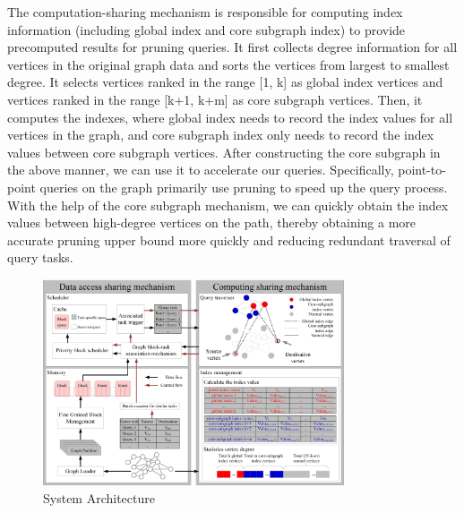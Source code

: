 \documentclass[lettersize,journal]{IEEEtran} %
\begin{document}
The computation-sharing mechanism is responsible for computing index information (including global index and core subgraph index) to provide precomputed results for pruning queries. It first collects degree information for all vertices in the original graph data and sorts the vertices from largest to smallest degree. It selects vertices ranked in the range [1, k] as global index vertices and vertices ranked in the range [k+1, k+m] as core subgraph vertices. Then, it computes the indexes, where global index needs to record the index values for all vertices in the graph, and core subgraph index only needs to record the index values between core subgraph vertices. After constructing the core subgraph in the above manner, we can use it to accelerate our queries. Specifically, point-to-point queries on the graph primarily use pruning to speed up the query process. With the help of the core subgraph mechanism, we can quickly obtain the index values between high-degree vertices on the path, thereby obtaining a more accurate pruning upper bound more quickly and reducing redundant traversal of query tasks.


\begin{figure}[!t]
\centering
\includegraphics[width=3.5in]{系统架构}
\caption{System Architecture}  
\label{系统架构}
\end{figure}
 
\end{document}
